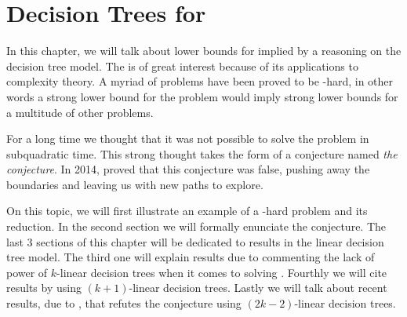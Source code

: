 \chapter{Decision Trees for \threeSUM}
\label{tree:3sum}

In this chapter, we will talk about lower bounds for \threeSUM implied by a
reasoning on the decision tree model. The \threeSUM is of great interest
because of its applications to complexity theory. A myriad of problems have
been proved to be \threeSUM-hard, in other words a strong lower bound for the
\threeSUM problem would imply strong lower bounds for a multitude of other
problems.

For a long time we thought that it was not possible to solve the \threeSUM
problem in subquadratic time. This strong thought takes the form of a
conjecture named \emph{the \threeSUM conjecture}. In 2014, \citet*{gronlund:2014}
proved that this conjecture was false, pushing away the
boundaries and leaving us with new paths to explore.

On this topic, we will first illustrate an example of a \threeSUM-hard problem
and its reduction. In the second section we will formally enunciate the
\threeSUM conjecture. The last 3 sections of this chapter will be dedicated to results
in the linear decision tree model. The third one will explain results due to
\citet*{erickson:1999} commenting the lack of power of $k$-linear
decision trees when it comes to solving \ksum. Fourthly we will cite
results by \citet*{ailon:2005} using $(k+1)$-linear decision trees.
Lastly we will talk about recent results, due to \citet*{gronlund:2014}, that
refutes the \threeSUM conjecture using $(2k-2)$-linear decision trees.
